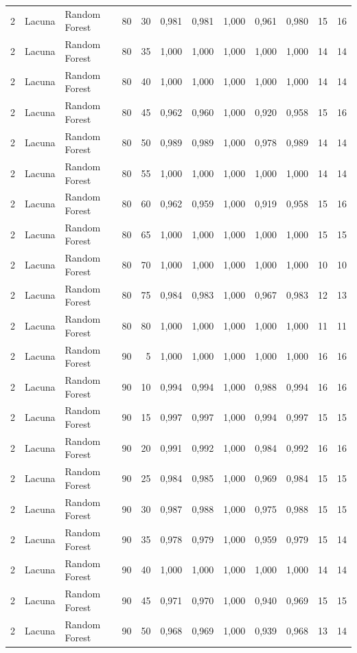 \begin{longtable}{@{}rllrrrrrrrrr@{}}
2 & Lacuna & Random Forest & 80 & 30 & 0,981 & 0,981 & 1,000 & 0,961 & 0,980 & 15 & 16 \\
2 & Lacuna & Random Forest & 80 & 35 & 1,000 & 1,000 & 1,000 & 1,000 & 1,000 & 14 & 14 \\
2 & Lacuna & Random Forest & 80 & 40 & 1,000 & 1,000 & 1,000 & 1,000 & 1,000 & 14 & 14 \\
2 & Lacuna & Random Forest & 80 & 45 & 0,962 & 0,960 & 1,000 & 0,920 & 0,958 & 15 & 16 \\
2 & Lacuna & Random Forest & 80 & 50 & 0,989 & 0,989 & 1,000 & 0,978 & 0,989 & 14 & 14 \\
2 & Lacuna & Random Forest & 80 & 55 & 1,000 & 1,000 & 1,000 & 1,000 & 1,000 & 14 & 14 \\
2 & Lacuna & Random Forest & 80 & 60 & 0,962 & 0,959 & 1,000 & 0,919 & 0,958 & 15 & 16 \\
2 & Lacuna & Random Forest & 80 & 65 & 1,000 & 1,000 & 1,000 & 1,000 & 1,000 & 15 & 15 \\
2 & Lacuna & Random Forest & 80 & 70 & 1,000 & 1,000 & 1,000 & 1,000 & 1,000 & 10 & 10 \\
2 & Lacuna & Random Forest & 80 & 75 & 0,984 & 0,983 & 1,000 & 0,967 & 0,983 & 12 & 13 \\
2 & Lacuna & Random Forest & 80 & 80 & 1,000 & 1,000 & 1,000 & 1,000 & 1,000 & 11 & 11 \\
2 & Lacuna & Random Forest & 90 & 5 & 1,000 & 1,000 & 1,000 & 1,000 & 1,000 & 16 & 16 \\
2 & Lacuna & Random Forest & 90 & 10 & 0,994 & 0,994 & 1,000 & 0,988 & 0,994 & 16 & 16 \\
2 & Lacuna & Random Forest & 90 & 15 & 0,997 & 0,997 & 1,000 & 0,994 & 0,997 & 15 & 15 \\
2 & Lacuna & Random Forest & 90 & 20 & 0,991 & 0,992 & 1,000 & 0,984 & 0,992 & 16 & 16 \\
2 & Lacuna & Random Forest & 90 & 25 & 0,984 & 0,985 & 1,000 & 0,969 & 0,984 & 15 & 15 \\
2 & Lacuna & Random Forest & 90 & 30 & 0,987 & 0,988 & 1,000 & 0,975 & 0,988 & 15 & 15 \\
2 & Lacuna & Random Forest & 90 & 35 & 0,978 & 0,979 & 1,000 & 0,959 & 0,979 & 15 & 14 \\
2 & Lacuna & Random Forest & 90 & 40 & 1,000 & 1,000 & 1,000 & 1,000 & 1,000 & 14 & 14 \\
2 & Lacuna & Random Forest & 90 & 45 & 0,971 & 0,970 & 1,000 & 0,940 & 0,969 & 15 & 15 \\
2 & Lacuna & Random Forest & 90 & 50 & 0,968 & 0,969 & 1,000 & 0,939 & 0,968 & 13 & 14 \\

\end{longtable}
